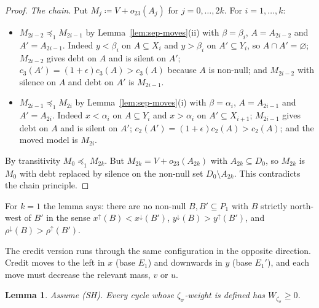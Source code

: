 \documentclass[11pt]{article}
\newtheorem{lemma}[theorem]{Lemma}
\theoremstyle{definition}\newtheorem{definition}[theorem]{Definition}
\theoremstyle{remark}\newtheorem{remark}[theorem]{Remark}
\begin{document}
\begin{proof}
\emph{The chain.} Put $M_j\coloneqq V+o_{23}(A_j)$ for $j=0,\dots,2k$. For
$i=1,\dots,k$:
\begin{itemize}[leftmargin=*,itemsep=2pt]
\item $M_{2i-2}\preceq_1M_{2i-1}$ by Lemma~\ref{lem:sep-moves}(ii) with
$\beta=\beta_i$, $A=A_{2i-2}$ and $A'=A_{2i-1}$. Indeed $y<\beta_i$ on
$A\subseteq X_i$ and $y>\beta_i$ on $A'\subseteq Y_i$, so $A\cap A'=\varnothing$;
$M_{2i-2}$ gives debt on $A$ and is silent on $A'$; $c_3(A')=(1+\epsilon)c_3(A)>c_3(A)$
because $A$ is non-null; and $M_{2i-2}$ with silence on $A$ and debt on $A'$
is $M_{2i-1}$.
\item $M_{2i-1}\preceq_1M_{2i}$ by Lemma~\ref{lem:sep-moves}(i) with
$\beta=\alpha_i$, $A=A_{2i-1}$ and $A'=A_{2i}$. Indeed $x<\alpha_i$ on
$A\subseteq Y_i$ and $x>\alpha_i$ on $A'\subseteq X_{i+1}$; $M_{2i-1}$ gives
debt on $A$ and is silent on $A'$; $c_2(A')=(1+\epsilon)c_2(A)>c_2(A)$; and
the moved model is $M_{2i}$.
\end{itemize}
By transitivity $M_0\preceq_1M_{2k}$. But $M_{2k}=V+o_{23}(A_{2k})$ with
$A_{2k}\subseteq D_0$, so $M_{2k}$ is $M_0$ with debt replaced by silence on
the non-null set $D_0\setminus A_{2k}$. This contradicts the chain principle.
\end{proof}

For $k=1$ the lemma says: there are no non-null $B,B'\subseteq P_1$ with $B$
strictly north-west of $B'$ in the sense $x^{\uparrow}(B)<x^{\downarrow}(B')$,
$y^{\downarrow}(B)>y^{\uparrow}(B')$, and $\rho^{\downarrow}(B)>\rho^{\uparrow}(B')$.

The credit version runs through the same configuration in the opposite
direction. Credit moves to the left in $x$ (base $E_1$) and downwards in $y$
(base $E_1'$), and each move must decrease the relevant mass, $v$ or $u$.

\begin{lemma}\label{lem:sep-credit}
Assume (SH). Every cycle whose $\zeta_\sigma$-weight is defined has
$W_{\zeta_\sigma}\ge0$.
\end{lemma}
\end{document}

